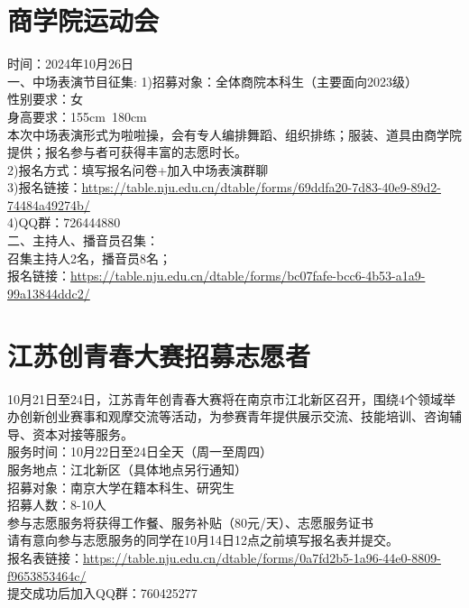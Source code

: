 \documentclass[letterpaper, 12pt]{article}
\begin{document}
\begin{multicols}{2}
\section{商学院运动会}
时间：2024年10月26日\\
一、中场表演节目征集:
    1)招募对象：全体商院本科生（主要面向2023级）\\
    性别要求：女\\
    身高要求：155cm~180cm\\
    本次中场表演形式为啦啦操，会有专人编排舞蹈、组织排练；服装、道具由商学院提供；报名参与者可获得丰富的志愿时长。\\
    2)报名方式：填写报名问卷+加入中场表演群聊\\
    3)报名链接：\url{https://table.nju.edu.cn/dtable/forms/69ddfa20-7d83-40e9-89d2-74484a49274b/}\\
    4)QQ群：726444880\\
二、主持人、播音员召集：\\
召集主持人2名，播音员8名；\\
报名链接：\url{https://table.nju.edu.cn/dtable/forms/bc07fafe-bcc6-4b53-a1a9-99a13844ddc2/}
\section{江苏创青春大赛招募志愿者}
10月21日至24日，江苏青年创青春大赛将在南京市江北新区召开，围绕4个领域举办创新创业赛事和观摩交流等活动，为参赛青年提供展示交流、技能培训、咨询辅导、资本对接等服务。\\
服务时间：10月22日至24日全天（周一至周四）\\
服务地点：江北新区（具体地点另行通知）\\
招募对象：南京大学在籍本科生、研究生\\
招募人数：8-10人\\
参与志愿服务将获得工作餐、服务补贴（80元/天）、志愿服务证书\\
请有意向参与志愿服务的同学在10月14日12点之前填写报名表并提交。\\
报名表链接：\url{https://table.nju.edu.cn/dtable/forms/0a7fd2b5-1a96-44e0-8809-f9653853464c/}\\
提交成功后加入QQ群：760425277\\


\end{multicols}
\end{document}
